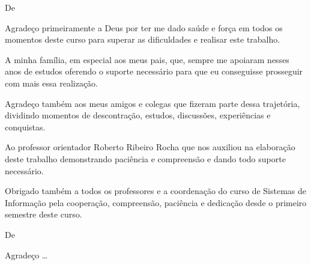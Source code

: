 \begin{agradecimentos}

De \imprimirAutorUm
\newline
\par Agradeço primeiramente a Deus por ter me dado saúde e força em todos os momentos
deste curso para superar as dificuldades e realisar este trabalho.

\par A minha família, em especial aos meus pais, que, sempre me apoiaram nesses anos
de estudos oferendo o suporte necessário para que eu conseguisse prosseguir com mais essa
realização.
 
\par Agradeço também aos meus amigos e colegas que fizeram parte dessa trajetória, dividindo 
momentos de descontração, estudos, discussões, experiências e conquistas.

\par Ao professor orientador Roberto Ribeiro Rocha que nos auxiliou na elaboração deste
trabalho demonstrando paciência e compreensão e dando todo suporte necessário.

\par Obrigado também a todos os professores e a coordenação do curso de Sistemas de Informação 
pela cooperação, compreensão, paciência e dedicação desde o primeiro semestre deste
curso.

\vspace*{\fill}
De \imprimirAutorDois
\newline
\par Agradeço \ldots

\end{agradecimentos}




